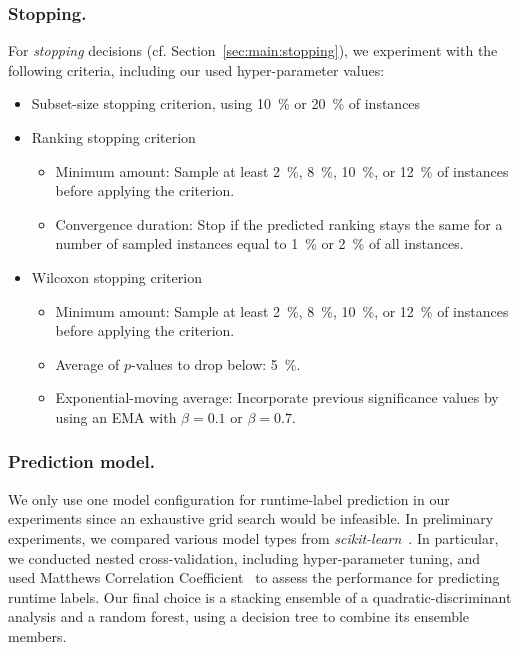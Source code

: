 \documentclass[runningheads]{llncs}
\begin{document}
\subsubsection{Stopping.}

For \emph{stopping} decisions (cf. Section~\ref{sec:main:stopping}), we experiment with the following criteria, including our used hyper-parameter values:

\begin{itemize}
  \item Subset-size stopping criterion, using \SI{10}{\%} or \SI{20}{\%} of instances
  \item Ranking stopping criterion
  \begin{itemize}
    \item Minimum amount: Sample at least \SI{2}{\%}, \SI{8}{\%}, \SI{10}{\%}, or \SI{12}{\%} of instances before applying the criterion.
    \item Convergence duration: Stop if the predicted ranking stays the same for a number of sampled instances equal to \SI{1}{\%} or \SI{2}{\%} of all instances.
  \end{itemize}

  \item Wilcoxon stopping criterion
  \begin{itemize}
    \item Minimum amount: Sample at least \SI{2}{\%}, \SI{8}{\%}, \SI{10}{\%}, or \SI{12}{\%} of instances before applying the criterion.
    \item Average of $p$-values to drop below: \SI{5}{\%}.
    \item Exponential-moving average: Incorporate previous significance values by using an EMA with $\beta = 0.1$ or $\beta = 0.7$.
  \end{itemize}
\end{itemize}

\subsubsection{Prediction model.}

We only use one model configuration for runtime-label prediction in our experiments since an exhaustive grid search would be infeasible.
In preliminary experiments, we compared various model types from \emph{scikit-learn}~\cite{scikit-learn}.
In particular, we conducted nested cross-validation, including hyper-parameter tuning, and used Matthews Correlation Coefficient~\cite{gorodkin2004comparing,matthews1975comparison} to assess the performance for predicting runtime labels.
Our final choice is a stacking ensemble of a quadratic-discriminant analysis and a random forest, using a decision tree to combine its ensemble members.
\end{document}
